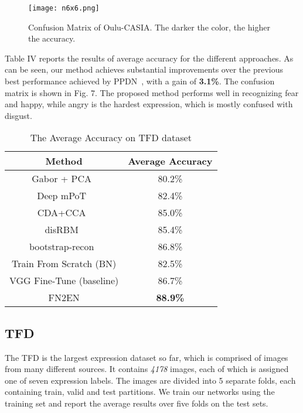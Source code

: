 \documentclass[a4paper, 10pt, conference]{ieeeconf}      %
\begin{document}
\begin{figure}[!ht]
  \centering
  \texttt{[image: n6x6.png]}
  \caption{Confusion Matrix of Oulu-CASIA. The darker the color, the higher the accuracy.}
  \label{figurelabel}
  \vspace{-2mm}
\end{figure}

Table IV reports the results of average accuracy for the different approaches. As can be seen, our method achieves substantial improvements over the previous best performance achieved by PPDN~\cite{zhao2016peak}, with a gain of \textbf{3.1\%}. %
The confusion matrix is shown in Fig. 7. The proposed method performs well in recognizing fear and happy, while angry is the hardest expression, which is mostly confused with disgust. 




\begin{table}
\caption{The Average Accuracy on TFD dataset}
\label{table_example}
\begin{center}
\begin{tabular}{|c||c|}
\hline
Method & Average Accuracy\\
\hline
Gabor + PCA~\cite{dailey2002empath} & 80.2\%\\
Deep mPoT~\cite{susskind2011deep} & 82.4\%\\
CDA+CCA~\cite{rifai2012disentangling} & 85.0\%\\
disRBM~\cite{reed2014learning} & 85.4\%\\
bootstrap-recon~\cite{reed2014training} & 86.8\%\\
Train From Scratch (BN) & 82.5\%\\
VGG Fine-Tune (baseline) & 86.7\%\\
\hline
FN2EN & \textbf{88.9\%}\\
\hline
\end{tabular}
\end{center}
\vspace{-2mm}
\end{table}
\subsection{TFD}
The TFD is the largest expression dataset so far, which is comprised of images from many different sources. It contains \emph{4178} images, each of which is assigned one of seven expression labels. The images are divided into 5 separate folds, each containing train, valid and test partitions. We train our networks using the training set and report the average results over five folds on the test sets. 
\end{document}

